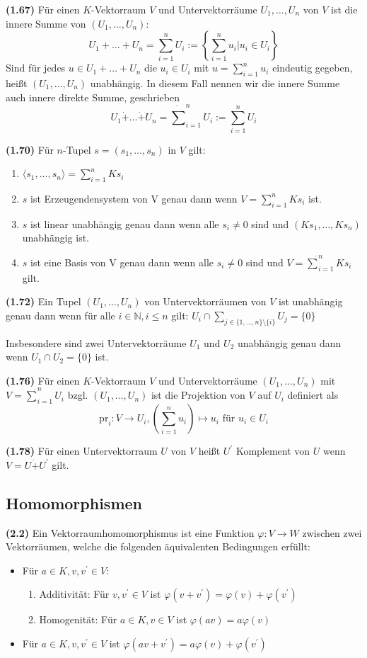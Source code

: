 \documentclass[a4paper,parskip=half*,DIV=15,fontsize=11pt]{scrartcl}
\newlength{\hangwidth}
\newcommand{\skript}[1]{\settowidth{\hangwidth}{\textbf{(#1)} }\hangpara{\hangwidth}{1}\textbf{(#1)} \ignorespaces} %
\newcommand{\pr}{\mathrm{pr}} %
\begin{document}
\skript{1.67} Für einen $K$-Vektorraum $V$ und Untervektorräume $U_1,\ldots,U_n$ von $V$ ist die innere Summe von $(U_1,\ldots,U_n)$:
$$ U_1 + \ldots + U_n =  \sum_{i = 1}^n U_i := \left\{ \sum_{i=1}^n u_i \vert u_i \in U_i \right\}$$
Sind für jedes $u \in U_1 + \ldots + U_n$ die $u_i \in U_i$ mit $u = \sum_{i=1}^n u_i$ eindeutig gegeben, heißt $(U_1,\ldots,U_n)$ unabhängig. In diesem Fall nennen wir die innere Summe auch innere direkte Summe, geschrieben
$$ U_1 \dot+ \ldots \dot+ U_n = \dot\sum_{i=1}^n U_i := \sum_{i=1}^n U_i$$

\skript{1.70} Für $n$-Tupel $s = (s_1,\ldots,s_n)$ in $V$ gilt:
\begin{enumerate}
	\item $\langle s_1,\ldots,s_n\rangle = \sum_{i=1}^{n} Ks_i$
	\item $s$ ist Erzeugendensystem von V genau dann wenn $V = \sum_{i=1}^n Ks_i$ ist.
	\item $s$ ist linear unabhängig genau dann wenn alle $s_i \neq 0$ sind und $(Ks_1,\ldots,Ks_n)$ unabhängig ist.
	\item $s$ ist eine Basis von V genau dann wenn alle $s_i \neq 0$ sind und $V = \dot\sum_{i=1}^n K s_i$  gilt.
\end{enumerate}

\skript{1.72} Ein Tupel $(U_1,\ldots,U_n)$ von Untervektorräumen von $V$ ist unabhängig genau dann wenn für alle $i \in \mathbb{N}, i \le n$ gilt: $U_i \cap \sum_{j \in \{1,\ldots,n\}\setminus\{i\}} U_j = \{0\}$

Insbesondere sind zwei Untervektorräume $U_1$ und $U_2$ unabhängig genau dann wenn $U_1 \cap U_2 = \{0\}$ ist.

\skript{1.76} Für einen $K$-Vektorraum $V$ und Untervektorräume $(U_1,\ldots,U_n)$ mit $V = \dot\sum_{i=1}^n U_i$ bzgl. $(U_1,\ldots,U_n)$ ist die Projektion von $V$ auf $U_i$ definiert als
$$ \pr_i: V \to U_i, \left(\sum_{i=1}^n u_i\right) \mapsto u_i \text{ für } u_i \in U_i$$

\skript{1.78} Für einen Untervektorraum $U$ von $V$ heißt $U^\prime$ Komplement von $U$ wenn $V = U \dot+ U^\prime$ gilt.

\subsection{Homomorphismen}

\skript{2.2} Ein Vektorraumhomomorphismus ist eine Funktion $\varphi : V \to W$ zwischen zwei Vektorräumen, welche die folgenden äquivalenten Bedingungen erfüllt:
\begin{itemize}
\item Für $a \in K, v, v^\prime \in V$:
	\begin{enumerate}
		\item Additivität: Für $v, v^\prime \in V$ ist $\varphi(v + v^\prime) = \varphi(v) + \varphi(v^\prime)$
		\item Homogenität: Für $a \in K, v \in V$ ist $\varphi(av) = a \varphi(v)$
	\end{enumerate}
\item Für $a \in K, v, v^\prime \in V$ ist $\varphi(av + v^\prime) = a \varphi(v) + \varphi(v^\prime)$
\end{itemize}
\end{document}
